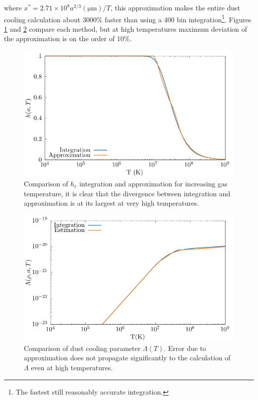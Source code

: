 where $x^* = 2.71\times 10^8 a^{2/3} (\si{\micro\metre})/T$, this approximation makes the entire dust cooling calculation about 3000\% faster than using a 400 bin integration\footnote{The fastest still reasonably accurate integration.}. Figures \ref{fig:hecomparison} and \ref{fig:lambdacomparison} compare each method, but at high temperatures maximum deviation of the approximation is on the order of $10\%$.


\begin{figure}[h]
  \centering
  \includegraphics{assets/xe/temp.pdf}
  \caption[Comparison of $h_e$ integration and approximation for increasing gas temperature]{Comparison of $h_e$ integration and approximation for increasing gas temperature, it is clear that the divergence between integration and approximation is at its largest at very high temperatures.}
  \label{fig:hecomparison}
\end{figure}

\begin{figure}[h]
  \centering
  \includegraphics{assets/dustcooling/lambda-comp.pdf}
  \caption[Comparison of dust cooling parameter $\Lambda$(T)]{Comparison of dust cooling parameter $\Lambda(T)$. Error due to approximation does not propagate significantly to the calculation of $\Lambda$ even at high temperatures.}
  \label{fig:lambdacomparison}
\end{figure}


